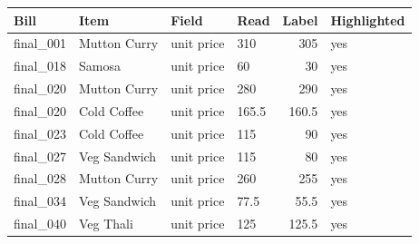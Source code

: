 \begin{tabular}{@{}llllrl@{}}
\toprule
Bill & Item & Field & Read & Label & Highlighted \\
\midrule
final\_001 & Mutton Curry & unit price & 310 & 305 & yes \\
final\_018 & Samosa & unit price & 60 & 30 & yes \\
final\_020 & Mutton Curry & unit price & 280 & 290 & yes \\
final\_020 & Cold Coffee & unit price & 165.5 & 160.5 & yes \\
final\_023 & Cold Coffee & unit price & 115 & 90 & yes \\
final\_027 & Veg Sandwich & unit price & 115 & 80 & yes \\
final\_028 & Mutton Curry & unit price & 260 & 255 & yes \\
final\_034 & Veg Sandwich & unit price & 77.5 & 55.5 & yes \\
final\_040 & Veg Thali & unit price & 125 & 125.5 & yes \\
\bottomrule
\end{tabular}
